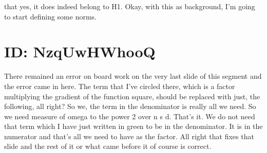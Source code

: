 \documentclass[10pt]{article}
\begin{document}
{that yes, it does indeed belong to H1. Okay, with this as background, I'm going to start defining some norms.

\section*{ID: NzqUwHWhooQ}
There remained an error on board work on the very last slide of this segment and the error came in here. The term that I've circled there, which is a factor multiplying the gradient of the function square, should be replaced with just, the following, all right? So we, the term in the denominator is really all we need. So we need measure of omega to the power 2 over n s d. That's it. We do not need that term which I have just written in green to be in the denominator. It is in the numerator and that's all we need to have as the factor. All right that fixes that slide and the rest of it or what came before it of course is correct.

}
\end{document}
